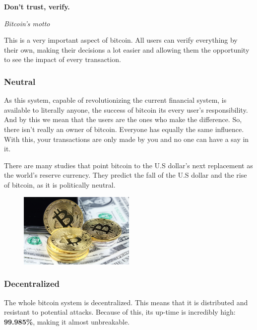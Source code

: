 \documentclass{article}
\newcommand\tab[1][1cm]{\hspace*{#1}}
\begin{document}
\renewcommand{\epigraphflush}{center}
\epigraph{\textbf{Don't trust, verify.}}{\textit{Bitcoin's motto}}

This is a very important aspect of bitcoin. All users can verify everything by their own, making their decisions a lot easier and allowing them the opportunity to see the impact of every transaction.


\subsubsection{Neutral}

\tab As this system, capable of revolutionizing the current financial system, is available to literally anyone, the success of bitcoin its every user's responsibility. And by this we mean that the users are the ones who make the difference. So, there isn't really an owner of bitcoin. Everyone has equally the same influence. With this, your transactions are only made by you and no one can have a say in it. 

There are many studies that point bitcoin to the U.S dollar's next replacement as the world's reserve currency. They predict the fall of the U.S dollar and the rise of bitcoin, as it is politically neutral. 

\begin{figure}[H]
    \begin{center}
        \includegraphics[width=0.5\textwidth]{images/dollar_bitcoin.jpeg}
    \end{center}
\end{figure}

\subsubsection{Decentralized}

\tab The whole bitcoin system is decentralized. This means that it is distributed and resistant to potential attacks. Because of this, its up-time is incredibly high: \textbf{99.985\%}, making it almost unbreakable. 
\end{document}
